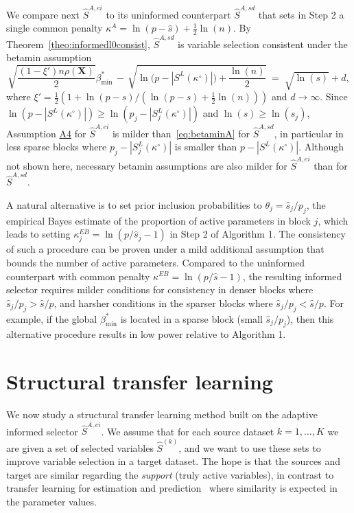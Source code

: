 \documentclass[
  12pt]{article}
\newcommand{\bX}{\mathbf{X}}
\begin{document}
We compare next $\hat{S}^{A,ei}$ to its uninformed counterpart $\hat{S}^{A,sd}$ that sets in Step 2 a single common penalty $\kappa^{A}=\ln(p-\hat{s})+ \tfrac{1}{2}\ln(n)$. By Theorem~\ref{theo:informedl0consist}, $\hat{S}^{A,sd}$ is variable selection consistent under the betamin assumption
\begin{equation}\label{eq:betaminA}
        \sqrt{\frac{ (1-\xi')n\rho(\bX)}{2}}\beta_{\min}^* \,- \,\sqrt{\ln\big(p-|S^{L}(\kappa^{\circ})|\big)+\frac{\ln(n)}{2}} \;=\; \sqrt{\ln(s)} +  d,
    \end{equation}
where $\xi'=\tfrac12(1+\ln(p-s)/(\ln(p-s)+\tfrac12 \ln(n)))$ and $d\to \infty$. 
Since
$\ln(p-|S^{L}(\kappa^{\circ})|)\geq \ln(p_j-|S_j^{L}(\kappa^{\circ})|)$ and $\ln(s)\geq \ln(s_j)$, Assumption \hyperlink{lab:A4}{A4} for $\hat S^{A,ei}$ is milder than~\eqref{eq:betaminA} for $\hat S^{A,sd}$, in particular in less sparse blocks where $p_j-|S_j^{L}(\kappa^{\circ})|$ is smaller than $p-|S^{L}(\kappa^{\circ})|$. Although not shown here, necessary betamin assumptions are also milder for $\hat S^{A,ei}$ than for $\hat S^{A,sd}$.

A natural alternative is to set prior inclusion probabilities to $\theta_j=\hat{s}_j/p_j$, the empirical Bayes estimate of the proportion of active parameters in block $j$, which leads to setting $\kappa^{EB}_j=\ln(p/\hat{s}_j-1)$ in Step 2 of Algorithm 1.
The consistency of such a procedure can be proven under a mild additional assumption that bounds the number of active parameters. Compared to the uninformed counterpart with common penalty  $\kappa^{EB}=\ln(p/\hat{s}-1)$, the resulting informed selector requires milder conditions for consistency in denser blocks where $\hat s_j/p_j>\hat s/p$, and harsher conditions in the sparser blocks where $\hat s_j/p_j<\hat s/p$. For example, if the global $\beta_{\min}^*$ is located in a sparse block (small $\hat s_j/p_j$), then this alternative procedure results in low power relative to Algorithm 1.

\section{Structural transfer learning}\label{sec:TL}

We now study a structural transfer learning method built on the adaptive informed selector $\hat S^{A,ei}$.
We assume that for each source dataset $k=1,\ldots,K$ we are given a set of selected variables $\hat{S}^{(k)}$, and we want to use these sets to improve variable selection in a target dataset.
The hope is that the sources and target are similar regarding the \emph{support} (truly active variables),
in contrast to transfer learning for estimation and prediction~\citep{Li2021,Tian2023,abba2024} where similarity is expected in the parameter values.
\end{document}
